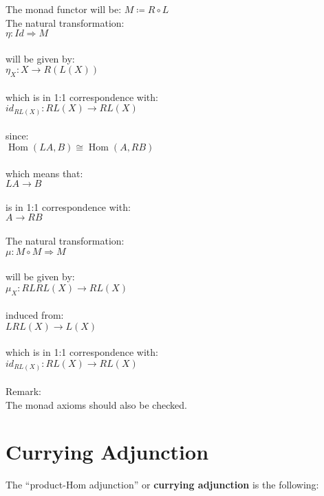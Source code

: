 \documentclass[a4paper, twoside, english, 11pt]{book}
\DeclareMathOperator{\Hom}{Hom}
\begin{document}
\noindent
The monad functor will be: $M \coloneqq R \circ L$ \\

\noindent
The natural transformation: \\
\indent
$\eta : Id \Rightarrow M$ \\\\
will be given by: \\
\indent
$\eta_X : X \rightarrow R(L(X))$ \\\\
which is in 1:1 correspondence with: \\
\indent
$id_{RL(X)} : RL(X) \rightarrow RL(X)$ \\\\
since: \\
\indent
$\Hom(LA, B) \cong \Hom(A, RB)$ \\\\
which means that: \\
\indent
$LA \rightarrow B$ \\\\
is in 1:1 correspondence with: \\
\indent
$A \rightarrow RB$ \\\\

\noindent
The natural transformation: \\
\indent
$\mu : M \circ M \Rightarrow M$ \\\\
will be given by: \\
\indent
$\mu_X : RLRL(X) \rightarrow RL(X)$ \\\\
induced from: \\
\indent
$LRL(X) \rightarrow L(X)$ \\\\
which is in 1:1 correspondence with: \\
\indent
$id_{RL(X)} : RL(X) \rightarrow RL(X)$ \\\\

\noindent
Remark: \\
The monad axioms should also be checked.



\section{Currying Adjunction}

The ``product-Hom adjunction'' or \textbf{currying adjunction} is the following: \\
\end{document}

